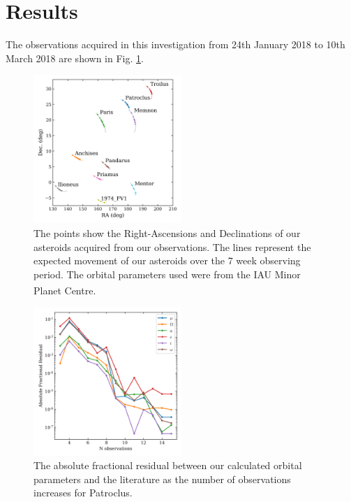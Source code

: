 \documentclass[10pt, twocolumn]{revtex4}    %
\newcommand{\scite}[1]{\textsuperscript{\cite{#1}}}
\begin{document}
\section{Results} 

The observations acquired in this investigation from 24th January 2018 to 10th March 2018 are shown in Fig. \ref{fig: observations}.

\begin{figure}[h!]
\centering
\includegraphics[width=0.5\textwidth]{20180402_115205_OBSERVATIONS_MAP}
\caption{The points show the Right-Ascensions and Declinations of our asteroids acquired from our observations. The lines represent the expected movement of our asteroids over the 7 week observing period. The orbital parameters used were from the IAU Minor Planet Centre.\scite{IAUMinorPlanet}}
\label{fig: observations}
\end{figure}

\begin{figure}[h!]
\centering
\includegraphics[width=0.5\textwidth]{20180402_155517_PAT_LIT_CONVERGENCE}
\caption{The absolute fractional residual between our calculated orbital parameters and the literature as the number of observations increases for Patroclus.}
\label{fig: pat convergence}
\end{figure}
\end{document}
